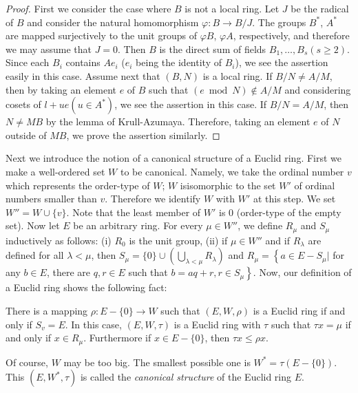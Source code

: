 \begin{proof}
First we consider the case where $B$ is not a local ring. Let $J$ be the radical of $B$ and consider the natural homomorphism $\varphi: B \to B / J$. The groups $B^*$, $A^*$ are mapped surjectively to the unit groups of $\varphi B$, $\varphi A$, respectively, and therefore we may assume that $J =0$. Then $B$ is the direct sum of fields $B_1, \ldots, B_s (s \geqslant 2)$. Since each $B_i$ contains $Ae_i$ ($e_i$ being the identity of $B_i$), we see the assertion easily in this case. Assume next that $(B,N)$ is a local ring. If $B/N \neq A/M$, then by taking an element $e$ of $B$ such that $(e \bmod N) \not\in A / M$ and considering cosets of $l+ue (u \in A^*)$, we see the assertion in this case. If $B/N = A / M$, then $N \neq MB$ by the lemma of Krull-Azumaya. Therefore, taking an element $e$ of $N$ outside of $MB$, we prove the assertion similarly.
\end{proof}

Next we introduce the notion of a canonical structure of a Euclid ring. First we make a well-ordered set $W$ to be canonical. Namely, we take the ordinal number $v$ which represents the order-type of $W$; $W$ is\pageoriginale isomorphic to the set $W'$ of ordinal numbers smaller than $v$. Therefore we identify $W$ with $W'$ at this step. We set $W'' = W \cup \{ v\}$. Note that the least member of $W'$ is 0 (order-type of the empty set). Now let $E$ be an arbitrary ring. For every $\mu \in W''$, we define $R_\mu$ and $S_\mu$ inductively as follows: (i) $R_0$ is the unit group, (ii) if $\mu \in W''$ and if $R_\lambda$ are defined for all $\lambda < \mu$, then $S_\mu = \{0\} \cup (\bigcup\limits_{\lambda < \mu} R_\lambda)$ and $R_\mu = \left\{a \in E - S_\mu | \right.$ for any $b\in E$, there are $q, r \in E$ such that $\left. b = aq+r , r\in S_\mu \right\}$. Now, our definition of a Euclid ring shows the following fact:

\begin{lemma}\label{art16-lem2.2}
There is a mapping $\rho: E - \{0\} \to W$ such that $(E, W, \rho)$ is a Euclid ring if and only if $S_v = E$. In this case, $(E, W, \tau)$ is a Euclid ring with $\tau$ such that $\tau x = \mu$ if and only if $x \in R_\mu$. Furthermore if $x \in E - \{0\} $, then $\tau x \leqslant \rho x$.
\end{lemma}

Of course, $W$ may be too big. The smallest possible one is $W^* = \tau (E - \{0\})$. This $(E, W^*,\tau)$ is called the {\em canonical structure} of the Euclid ring $E$.

